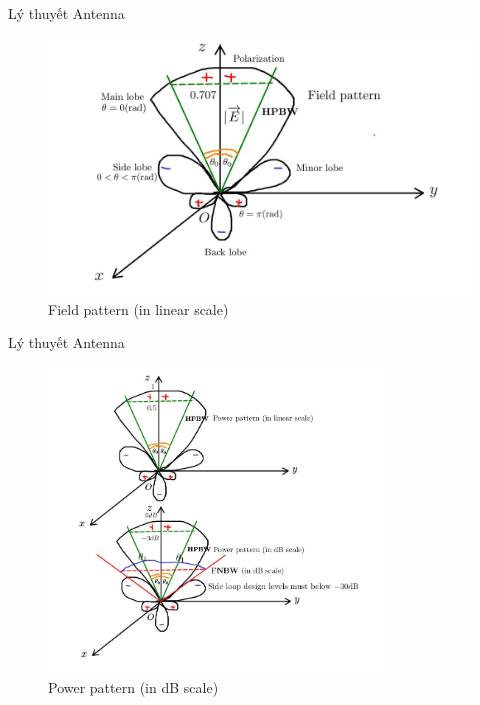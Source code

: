 \documentclass[8pt]{beamer}
\begin{document}
\begin{frame}{Lý thuyết Antenna}
\begin{figure}[h]
			\includegraphics[width=1\textwidth]{linear.jpg}
			\caption{Field pattern (in linear scale)}			\label{fig:re8}
\end{figure}
\end{frame}
\begin{frame}{Lý thuyết Antenna}

\begin{figure}[h]
			\includegraphics[width=0.8\textwidth]{power.jpg}
			\caption{Power pattern (in dB scale)}			\label{fig:re9}
\end{figure}
\end{frame}
\end{document}
